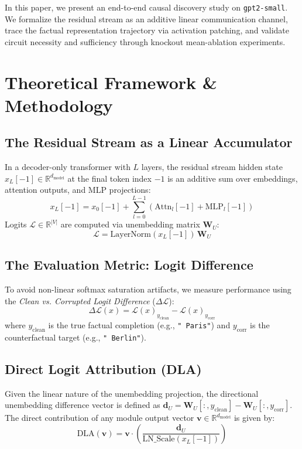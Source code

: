 \documentclass[10pt,twocolumn,letterpaper]{article}
\begin{document}
In this paper, we present an end-to-end causal discovery study on \texttt{gpt2-small}. We formalize the residual stream as an additive linear communication channel, trace the factual representation trajectory via activation patching, and validate circuit necessity and sufficiency through knockout mean-ablation experiments.

\section{Theoretical Framework \& Methodology}

\subsection{The Residual Stream as a Linear Accumulator}
In a decoder-only transformer with $L$ layers, the residual stream hidden state $x_L[-1] \in \mathbb{R}^{d_{\text{model}}}$ at the final token index $-1$ is an additive sum over embeddings, attention outputs, and MLP projections:
\begin{equation}
x_L[-1] = x_0[-1] + \sum_{l=0}^{L-1} \left( \text{Attn}_l[-1] + \text{MLP}_l[-1] \right)
\end{equation}
Logits $\mathcal{L} \in \mathbb{R}^{|V|}$ are computed via unembedding matrix $\mathbf{W}_U$:
\begin{equation}
\mathcal{L} = \text{LayerNorm}(x_L[-1]) \, \mathbf{W}_U
\end{equation}

\subsection{The Evaluation Metric: Logit Difference}
To avoid non-linear softmax saturation artifacts, we measure performance using the \textit{Clean vs. Corrupted Logit Difference} ($\Delta \mathcal{L}$):
\begin{equation}
\Delta \mathcal{L}(x) = \mathcal{L}(x)_{y_{\text{clean}}} - \mathcal{L}(x)_{y_{\text{corr}}}
\end{equation}
where $y_{\text{clean}}$ is the true factual completion (e.g., \texttt{" Paris"}) and $y_{\text{corr}}$ is the counterfactual target (e.g., \texttt{" Berlin"}).

\subsection{Direct Logit Attribution (DLA)}
Given the linear nature of the unembedding projection, the directional unembedding difference vector is defined as $\mathbf{d}_U = \mathbf{W}_U[:, y_{\text{clean}}] - \mathbf{W}_U[:, y_{\text{corr}}]$. The direct contribution of any module output vector $\mathbf{v} \in \mathbb{R}^{d_{\text{model}}}$ is given by:
\begin{equation}
\text{DLA}(\mathbf{v}) = \mathbf{v} \cdot \left( \frac{\mathbf{d}_U}{\text{LN\_Scale}(x_L[-1])} \right)
\end{equation}
\end{document}
